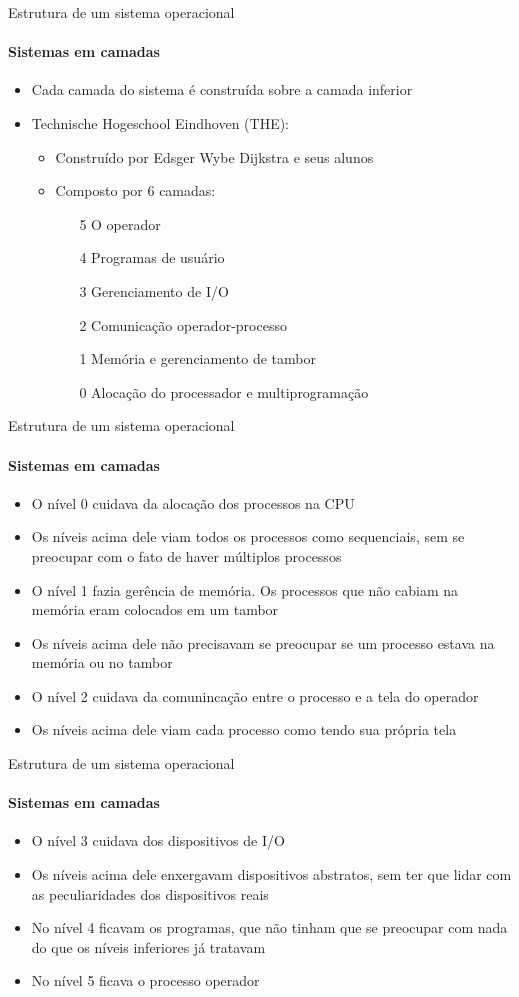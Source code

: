 \documentclass{beamer}
\begin{document}
\begin{frame}{Estrutura de um sistema operacional}
	\framesubtitle{Sistemas em camadas}
	\begin{itemize}
		\item Cada camada do sistema é construída sobre a camada inferior
		\item Technische Hogeschool Eindhoven (THE):
		\begin{itemize}
			\item Construído por Edsger Wybe Dijkstra e seus alunos
			\item Composto por 6 camadas:
			\begin{itemize}
				\item[5] O operador
				\item[4] Programas de usuário
				\item[3] Gerenciamento de I/O
				\item[2] Comunicação operador-processo
				\item[1] Memória e gerenciamento de tambor
				\item[0] Alocação do processador e multiprogramação
			\end{itemize}
		\end{itemize}
	\end{itemize}
\end{frame}
\begin{frame}{Estrutura de um sistema operacional}
	\framesubtitle{Sistemas em camadas}
	\begin{itemize}
		\item O nível 0 cuidava da alocação dos processos na CPU
		\item Os níveis acima dele viam todos os processos como sequenciais, sem se preocupar com o fato de haver múltiplos processos
		\item O nível 1 fazia gerência de memória. Os processos que não cabiam na memória eram colocados em um tambor
		\item Os níveis acima dele não precisavam se preocupar se um processo estava na memória ou no tambor
		\item O nível 2 cuidava da comunincação entre o processo e a tela do operador
		\item Os níveis acima dele viam cada processo como tendo sua própria tela
	\end{itemize}
\end{frame}
\begin{frame}{Estrutura de um sistema operacional}
	\framesubtitle{Sistemas em camadas}
	\begin{itemize}
		\item O nível 3 cuidava dos dispositivos de I/O
		\item Os níveis acima dele enxergavam dispositivos abstratos, sem ter que lidar com as peculiaridades dos dispositivos reais
		\item No nível 4 ficavam os programas, que não tinham que se preocupar com nada do que os níveis inferiores já tratavam
		\item No nível 5 ficava o processo operador
	\end{itemize}
\end{frame}
\end{document}
